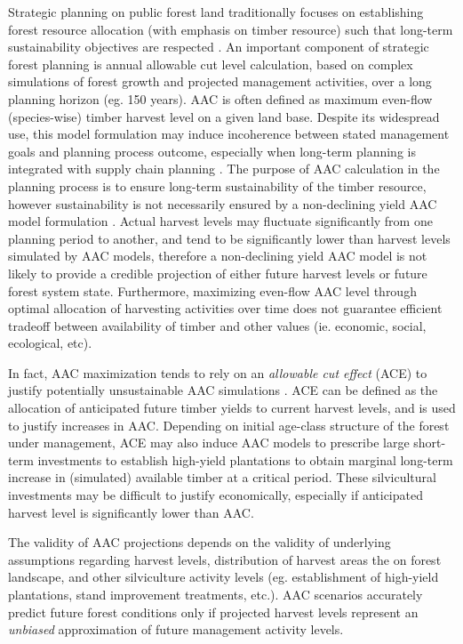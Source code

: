 \label{sec:strategic-effectiveness}

Strategic planning on public forest land traditionally focuses on
establishing forest resource allocation (with emphasis on timber
resource) such that long-term sustainability objectives are respected
\citep{gunn2007models,davis2001forest-ch11}.  An important component of
strategic forest planning is annual allowable cut level
calculation, based on complex simulations of forest growth and
projected management activities, over a long planning horizon (eg. 150
years). AAC is often defined as maximum even-flow (species-wise)
timber harvest level on a given land base.  Despite its widespread use,
this model formulation may induce incoherence between stated
management goals and planning process outcome, especially when
long-term planning is integrated with supply chain planning
\citep{gunn2009some}.  The purpose of AAC calculation in the planning
process is to ensure long-term sustainability of the timber resource,
however sustainability is not necessarily ensured by a non-declining yield
AAC model formulation \citep{gunn2009some}.  Actual harvest levels may
fluctuate significantly from one planning period to another, and tend
to be significantly lower than harvest levels simulated by AAC models,
therefore a non-declining yield AAC model is not likely to provide a
credible projection of either future harvest levels or future forest
system state. Furthermore, maximizing even-flow AAC level through
optimal allocation of harvesting activities over time does not
guarantee efficient tradeoff between availability of timber and other
values (ie. economic, social, ecological, etc).

In fact, AAC maximization tends to rely on an \emph{allowable cut effect}
(ACE) to justify potentially unsustainable AAC simulations
\citep{luckert1995allowable}. ACE can be defined as the allocation of
anticipated future timber yields to current harvest levels, and is
used to justify increases in AAC. Depending on initial age-class
structure of the forest under management, ACE may also induce AAC
models to prescribe large short-term investments to establish
high-yield plantations to obtain marginal long-term increase in
(simulated) available timber at a critical period. These silvicultural
investments may be difficult to justify economically, especially if
anticipated harvest level is significantly lower than AAC.

The validity of AAC projections depends on the validity of underlying
assumptions regarding harvest levels, distribution of harvest areas the on
forest landscape, and other silviculture activity levels
(eg. establishment of high-yield plantations, stand improvement
treatments, etc.). AAC scenarios accurately predict future forest
conditions only  if projected harvest levels represent an \emph{unbiased}
approximation of future management activity levels.

